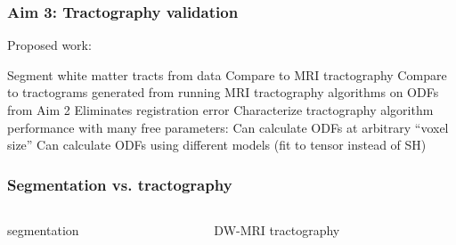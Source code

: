\documentclass[presentation, 10pt]{beamer}
\begin{document}
\begin{frame}
  \frametitle{Aim 3: Tractography validation}
  Proposed work:
  \begin{outline}
    \1 Segment white matter tracts from \uct data
    \1 Compare to MRI tractography
    \1 Compare to tractograms generated from running MRI tractography algorithms on
    \uct ODFs from Aim 2
    \2 Eliminates registration error
    \2 Characterize tractography algorithm performance with many free parameters:
    \3 Can calculate ODFs at arbitrary ``voxel size''
    \3 Can calculate ODFs using different models (fit to tensor instead of SH)
  \end{outline}
\end{frame}

\begin{frame}
  \frametitle{Segmentation vs. tractography}
  \begin{columns}
    \begin{column}{0.5\textwidth}
      \begin{center}
        \uct segmentation
      \end{center}
    \end{column}
    \begin{column}{0.5\textwidth}
      \begin{center}
        DW-MRI tractography
      \end{center}
    \end{column}
  \end{columns}  
\end{frame}
\end{document}

